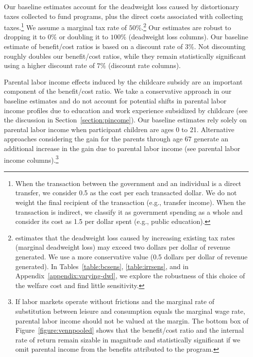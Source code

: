 Our baseline estimates account for the deadweight loss caused by distortionary taxes collected to fund programs, plus the direct costs associated with collecting taxes.\footnote{When the transaction between the government and an individual is a direct transfer, we consider 0.5 as the cost per each transacted dollar. We do not weight the final recipient of the transaction (e.g., transfer income). When the transaction is indirect, we classify it as government spending as a whole and consider its cost as 1.5 per dollar spent (e.g., public education).} We assume a marginal tax rate of $50\%$.\footnote{\citet{Feldstein_1999_REStat} estimates that the deadweight loss caused by increasing existing tax rates (marginal deadweight loss) may exceed two dollars per dollar of revenue generated. We use a more conservative value (0.5 dollars per dollar of revenue generated). In Tables~\ref{table:bcsens}, \ref{table:irrsens}, and in  Appendix~\ref{appendix:varying-dwl}, we explore the robustness of this choice of the welfare cost and find little sensitivity.} Our estimates are robust to dropping it to $0\%$ or doubling it to $100\%$ (deadweight loss columns). Our baseline estimate of benefit/cost ratios is based on a discount rate of $3\%$. Not discounting roughly doubles our benefit/cost ratios, while they remain statistically significant using a higher discount rate of $7\%$ (discount rate columns).

Parental labor income effects induced by the childcare subsidy are an important component of the benefit/cost ratio. We take a conservative approach in our baseline estimates and do not account for potential shifts in parental labor income profiles due to education and work experience subsidized by childcare (see the discussion in Section~\ref{section:pincome}). Our baseline estimates rely solely on parental labor income when participant children are ages 0 to 21. Alternative approaches considering the gain for the parents through age 67 generate an additional increase in the gain due to parental labor income (see parental labor income columns).\footnote{If labor markets operate without frictions and the marginal rate of substitution between leisure and consumption equals the marginal wage rate, parental labor income should not be valued at the margin. The bottom box of Figure~\ref{figure:vennpooled} shows that the benefit/cost ratio and the internal rate of return remain sizable in magnitude and statistically significant if we omit parental income from the benefits attributed to the program.}

